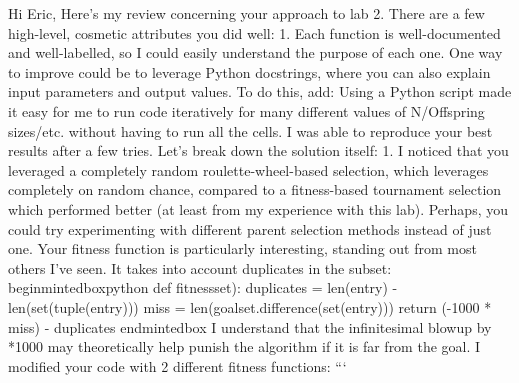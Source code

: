 Hi Eric,\markdownRendererInterblockSeparator
{}Here's my review concerning your approach to lab 2.\markdownRendererInterblockSeparator
{}There are a few high-level, cosmetic attributes you did well: 1. Each function is well-documented and well-labelled, so I could easily understand the purpose of each one. One way to improve could be to leverage Python docstrings, where you can also explain input parameters and output values. To do this, add:\markdownRendererInterblockSeparator
{}\markdownRendererInterblockSeparator
{}\markdownRendererOlBeginTight
{}Using a Python script made it easy for me to run code iteratively for many different values of N/Offspring sizes/etc. without having to run all the cells. I was able to reproduce your best results after a few tries.\markdownRendererOlItemEnd 
\markdownRendererOlEndTight \markdownRendererInterblockSeparator
{}Let's break down the solution itself: 1. I noticed that you leveraged a completely random roulette-wheel-based selection, which leverages completely on random chance, compared to a fitness-based tournament selection which performed better (at least from my experience with this lab). Perhaps, you could try experimenting with different parent selection methods instead of just one.\markdownRendererInterblockSeparator
{}\markdownRendererOlBeginTight
{}Your fitness function is particularly interesting, standing out from most others I've seen. It takes into account duplicates in the subset:\markdownRendererOlItemEnd 
\markdownRendererOlEndTight \markdownRendererInterblockSeparator
{}\markdownRendererBackslash{}begin\markdownRendererLeftBrace{}mintedbox\markdownRendererRightBrace{}\markdownRendererLeftBrace{}python\markdownRendererRightBrace{} def fitnessset): duplicates = len(entry) - len(set(tuple(entry))) miss = len(goal\markdownRendererUnderscore{}set.difference(set(entry))) return (-1000 * miss) - duplicates \markdownRendererBackslash{}end\markdownRendererLeftBrace{}mintedbox\markdownRendererRightBrace{}\markdownRendererInterblockSeparator
{}I understand that the infinitesimal blowup by \markdownRendererDollarSign{}*1000\markdownRendererDollarSign{} may theoretically help punish the algorithm if it is far from the goal. I modified your code with 2 different fitness functions:  ```\markdownRendererInterblockSeparator
